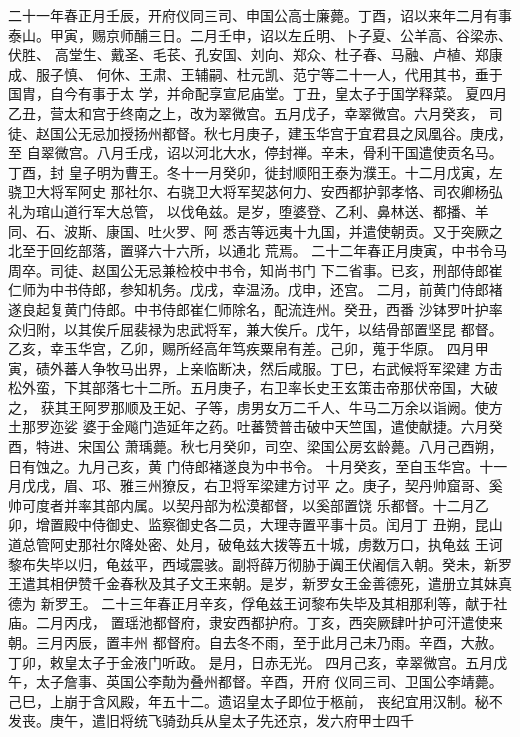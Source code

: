 \documentclass[12pt,UTF8]{ctexbook}
\begin{document}
二十一年春正月壬辰，开府仪同三司、申国公高士廉薨。丁酉，诏以来年二月有事
泰山。甲寅，赐京师酺三日。二月壬申，诏以左丘明、卜子夏、公羊高、谷梁赤、伏胜、
高堂生、戴圣、毛苌、孔安国、刘向、郑众、杜子春、马融、卢植、郑康成、服子慎、
何休、王肃、王辅嗣、杜元凯、范宁等二十一人，代用其书，垂于国胄，自今有事于太
学，并命配享宣尼庙堂。丁丑，皇太子于国学释菜。
夏四月乙丑，营太和宫于终南之上，改为翠微宫。五月戊子，幸翠微宫。六月癸亥，
司徒、赵国公无忌加授扬州都督。秋七月庚子，建玉华宫于宜君县之凤凰谷。庚戌，至
自翠微宫。八月壬戌，诏以河北大水，停封禅。辛未，骨利干国遣使贡名马。丁酉，封
皇子明为曹王。冬十一月癸卯，徙封顺阳王泰为濮王。十二月戊寅，左骁卫大将军阿史
那社尔、右骁卫大将军契苾何力、安西都护郭孝恪、司农卿杨弘礼为琯山道行军大总管，
以伐龟兹。是岁，堕婆登、乙利、鼻林送、都播、羊同、石、波斯、康国、吐火罗、阿
悉吉等远夷十九国，并遣使朝贡。又于突厥之北至于回纥部落，置驿六十六所，以通北
荒焉。
二十二年春正月庚寅，中书令马周卒。司徒、赵国公无忌兼检校中书令，知尚书门
下二省事。已亥，刑部侍郎崔仁师为中书侍郎，参知机务。戊戌，幸温汤。戊申，还宫。
二月，前黄门侍郎褚遂良起复黄门侍郎。中书侍郎崔仁师除名，配流连州。癸丑，西番
沙钵罗叶护率众归附，以其俟斤屈裴禄为忠武将军，兼大俟斤。戊午，以结骨部置坚昆
都督。乙亥，幸玉华宫，乙卯，赐所经高年笃疾粟帛有差。己卯，蒐于华原。
四月甲寅，碛外蕃人争牧马出界，上亲临断决，然后咸服。丁巳，右武候将军梁建
方击松外蛮，下其部落七十二所。五月庚子，右卫率长史王玄策击帝那伏帝国，大破之，
获其王阿罗那顺及王妃、子等，虏男女万二千人、牛马二万余以诣阙。使方土那罗迩娑
婆于金飚门造延年之药。吐蕃赞普击破中天竺国，遣使献捷。六月癸酉，特进、宋国公
萧瑀薨。秋七月癸卯，司空、梁国公房玄龄薨。八月己酉朔，日有蚀之。九月己亥，黄
门侍郎褚遂良为中书令。
十月癸亥，至自玉华宫。十一月戊戌，眉、邛、雅三州獠反，右卫将军梁建方讨平
之。庚子，契丹帅窟哥、奚帅可度者并率其部内属。以契丹部为松漠都督，以奚部置饶
乐都督。十二月乙卯，增置殿中侍御史、监察御史各二员，大理寺置平事十员。闰月丁
丑朔，昆山道总管阿史那社尔降处密、处月，破龟兹大拨等五十城，虏数万口，执龟兹
王诃黎布失毕以归，龟兹平，西域震骇。副将薛万彻胁于阗王伏阇信入朝。癸未，新罗
王遣其相伊赞千金春秋及其子文王来朝。是岁，新罗女王金善德死，遣册立其妹真德为
新罗王。
二十三年春正月辛亥，俘龟兹王诃黎布失毕及其相那利等，献于社庙。二月丙戌，
置瑶池都督府，隶安西都护府。丁亥，西突厥肆叶护可汗遣使来朝。三月丙辰，置丰州
都督府。自去冬不雨，至于此月己未乃雨。辛酉，大赦。丁卯，敕皇太子于金液门听政。
是月，日赤无光。
四月己亥，幸翠微宫。五月戊午，太子詹事、英国公李勣为叠州都督。辛酉，开府
仪同三司、卫国公李靖薨。己巳，上崩于含风殿，年五十二。遗诏皇太子即位于柩前，
丧纪宜用汉制。秘不发丧。庚午，遣旧将统飞骑劲兵从皇太子先还京，发六府甲士四千
\end{document}
